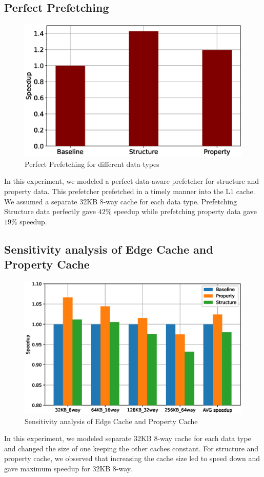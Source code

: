 \documentclass[a4paper,12pt, final]{report}
\begin{document}
\subsection{Perfect Prefetching}
\begin{figure}[!htb]
    \centering
    \includegraphics[width=0.6\linewidth]{perfect_L1_cache.eps}
    \caption{Perfect Prefetching for different data types}
    \label{fig:my_label}
\end{figure}
In this experiment, we modeled a perfect data-aware prefetcher for structure and property data. This prefetcher prefetched in a timely manner into the L1 cache. We assumed a separate 32KB 8-way cache for each data type. Prefetching Structure data perfectly gave $42\%$ speedup while prefetching property data gave $19\%$ speedup.

\subsection{Sensitivity analysis of Edge Cache and Property Cache}
\begin{figure}[!htb]
    \centering
    \includegraphics[width=0.8\linewidth]{sensitivity.eps}
    \caption{Sensitivity analysis of Edge Cache and Property Cache}
    \label{fig:my_label}
\end{figure}
In this experiment, we modeled separate 32KB 8-way cache for each data type and changed the size of one keeping the other caches constant. For structure and property cache, we observed that increasing the cache size led to speed down and gave maximum speedup for 32KB 8-way. 
\end{document}
